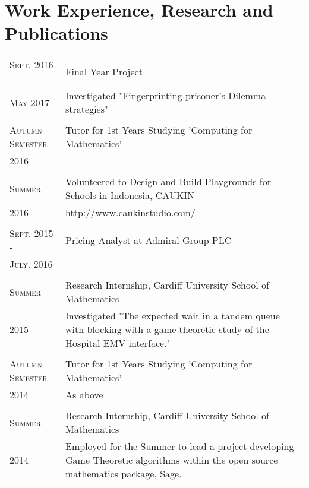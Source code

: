 \documentclass[a4paper]{article}
\begin{document}
\section{Work Experience, Research and Publications}
\begin{tabularx}{\textwidth}{lX}

\textsc{Sept. 2016 - } & Final Year Project \\
\textsc{May 2017} & \footnotesize{Investigated "Fingerprinting prisoner’s Dilemma strategies"}
\\
\\
\textsc{Autumn Semester} & Tutor for 1st Years Studying 'Computing for Mathematics'\\
\textsc{2016} & \footnotesize{}
\\
\\
\textsc{Summer} & Volunteered to Design and Build Playgrounds for Schools in Indonesia, CAUKIN \\
\textsc{2016} & \footnotesize{\url{http://www.caukinstudio.com/}}
\\
\\
\textsc{Sept. 2015 -} & Pricing Analyst at Admiral Group PLC \\
\textsc{July. 2016} & \footnotesize{}
\\
\\
\textsc{Summer} & Research Internship, Cardiff University School of Mathematics \\
\textsc{2015} & \footnotesize{Investigated "The expected wait in a tandem queue with blocking with a game theoretic study of the Hospital EMV interface."}
\\
\\
\textsc{Autumn Semester} & Tutor for 1st Years Studying 'Computing for Mathematics'\\
\textsc{2014} & \footnotesize{As above}
\\
\\
\textsc{Summer} & Research Internship, Cardiff University School of Mathematics \\
\textsc{2014} & \footnotesize{Employed for the Summer to lead a project developing Game Theoretic algorithms within the open source mathematics package, Sage.
}
\end{tabularx}
\end{document}
